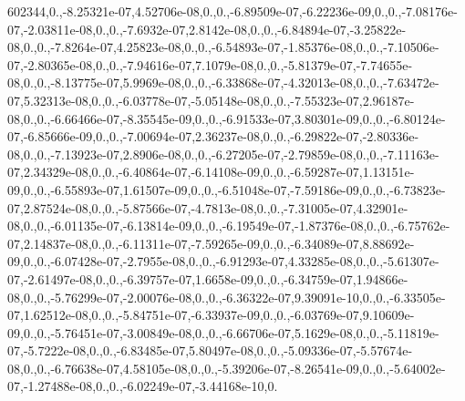 \begin{DoxyCompactItemize}
602344,0.,-\/8.\-25321e-\/07,4.\-52706e-\/08,0.,0.,-\/6.\-89509e-\/07,-\/6.\-22236e-\/09,0.,0.,-\/7.\-08176e-\/07,-\/2.\-03811e-\/08,0.,0.,-\/7.\-6932e-\/07,2.\-8142e-\/08,0.,0.,-\/6.\-84894e-\/07,-\/3.\-25822e-\/08,0.,0.,-\/7.\-8264e-\/07,4.\-25823e-\/08,0.,0.,-\/6.\-54893e-\/07,-\/1.\-85376e-\/08,0.,0.,-\/7.\-10506e-\/07,-\/2.\-80365e-\/08,0.,0.,-\/7.\-94616e-\/07,7.\-1079e-\/08,0.,0.,-\/5.\-81379e-\/07,-\/7.\-74655e-\/08,0.,0.,-\/8.\-13775e-\/07,5.\-9969e-\/08,0.,0.,-\/6.\-33868e-\/07,-\/4.\-32013e-\/08,0.,0.,-\/7.\-63472e-\/07,5.\-32313e-\/08,0.,0.,-\/6.\-03778e-\/07,-\/5.\-05148e-\/08,0.,0.,-\/7.\-55323e-\/07,2.\-96187e-\/08,0.,0.,-\/6.\-66466e-\/07,-\/8.\-35545e-\/09,0.,0.,-\/6.\-91533e-\/07,3.\-80301e-\/09,0.,0.,-\/6.\-80124e-\/07,-\/6.\-85666e-\/09,0.,0.,-\/7.\-00694e-\/07,2.\-36237e-\/08,0.,0.,-\/6.\-29822e-\/07,-\/2.\-80336e-\/08,0.,0.,-\/7.\-13923e-\/07,2.\-8906e-\/08,0.,0.,-\/6.\-27205e-\/07,-\/2.\-79859e-\/08,0.,0.,-\/7.\-11163e-\/07,2.\-34329e-\/08,0.,0.,-\/6.\-40864e-\/07,-\/6.\-14108e-\/09,0.,0.,-\/6.\-59287e-\/07,1.\-13151e-\/09,0.,0.,-\/6.\-55893e-\/07,1.\-61507e-\/09,0.,0.,-\/6.\-51048e-\/07,-\/7.\-59186e-\/09,0.,0.,-\/6.\-73823e-\/07,2.\-87524e-\/08,0.,0.,-\/5.\-87566e-\/07,-\/4.\-7813e-\/08,0.,0.,-\/7.\-31005e-\/07,4.\-32901e-\/08,0.,0.,-\/6.\-01135e-\/07,-\/6.\-13814e-\/09,0.,0.,-\/6.\-19549e-\/07,-\/1.\-87376e-\/08,0.,0.,-\/6.\-75762e-\/07,2.\-14837e-\/08,0.,0.,-\/6.\-11311e-\/07,-\/7.\-59265e-\/09,0.,0.,-\/6.\-34089e-\/07,8.\-88692e-\/09,0.,0.,-\/6.\-07428e-\/07,-\/2.\-7955e-\/08,0.,0.,-\/6.\-91293e-\/07,4.\-33285e-\/08,0.,0.,-\/5.\-61307e-\/07,-\/2.\-61497e-\/08,0.,0.,-\/6.\-39757e-\/07,1.\-6658e-\/09,0.,0.,-\/6.\-34759e-\/07,1.\-94866e-\/08,0.,0.,-\/5.\-76299e-\/07,-\/2.\-00076e-\/08,0.,0.,-\/6.\-36322e-\/07,9.\-39091e-\/10,0.,0.,-\/6.\-33505e-\/07,1.\-62512e-\/08,0.,0.,-\/5.\-84751e-\/07,-\/6.\-33937e-\/09,0.,0.,-\/6.\-03769e-\/07,9.\-10609e-\/09,0.,0.,-\/5.\-76451e-\/07,-\/3.\-00849e-\/08,0.,0.,-\/6.\-66706e-\/07,5.\-1629e-\/08,0.,0.,-\/5.\-11819e-\/07,-\/5.\-7222e-\/08,0.,0.,-\/6.\-83485e-\/07,5.\-80497e-\/08,0.,0.,-\/5.\-09336e-\/07,-\/5.\-57674e-\/08,0.,0.,-\/6.\-76638e-\/07,4.\-58105e-\/08,0.,0.,-\/5.\-39206e-\/07,-\/8.\-26541e-\/09,0.,0.,-\/5.\-64002e-\/07,-\/1.\-27488e-\/08,0.,0.,-\/6.\-02249e-\/07,-\/3.\-44168e-\/10,0.
\end{DoxyCompactItemize}
